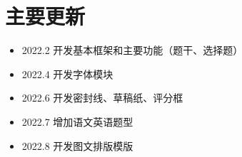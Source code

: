
\section{主要更新}

\begin{itemize}
  \item 2022.2 开发基本框架和主要功能（题干、选择题）
  \item 2022.4 开发字体模块
  \item 2022.6 开发密封线、草稿纸、评分框
  \item 2022.7 增加语文英语题型
  \item 2022.8 开发图文排版模版
\end{itemize}